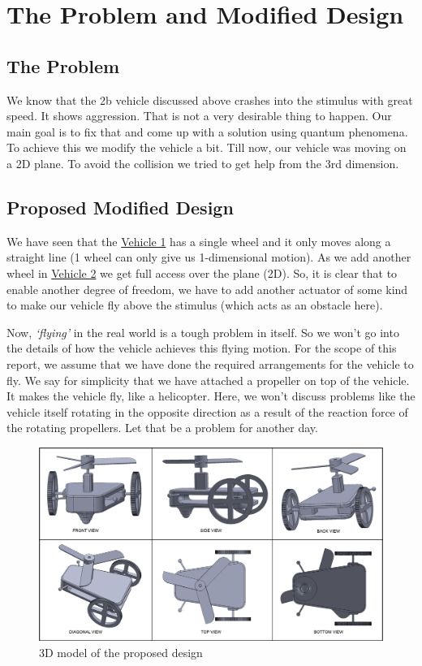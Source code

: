 \section{The Problem and Modified Design}
    
    \subsection{The Problem}
    We know that the 2b vehicle discussed above crashes into the stimulus with great speed. It shows aggression. That is not a very desirable thing to happen. Our main goal is to fix that and come up with a solution using quantum phenomena. To achieve this we modify the vehicle a bit. Till now, our vehicle was moving on a 2D plane. To avoid the collision we tried to get help from the 3rd dimension.
    
    \subsection{Proposed Modified Design}
    We have seen that the \hyperref[sec:Vehicle_1]{Vehicle 1} has a single wheel and it only moves along a straight line (1 wheel can only give us 1-dimensional motion). As we add another wheel in \hyperref[sec:Vehicle_2]{Vehicle 2} we get full access over the plane (2D). So, it is clear that to enable another degree of freedom, we have to add another actuator of some kind to make our vehicle fly above the stimulus (which acts as an obstacle here).

    Now, \textit{`flying'} in the real world is a tough problem in itself. So we won't go into the details of how the vehicle achieves this flying motion. For the scope of this report, we assume that we have done the required arrangements for the vehicle to fly. We say for simplicity that we have attached a propeller on top of the vehicle. It makes the vehicle fly, like a helicopter. Here, we won't discuss problems like the vehicle itself rotating in the opposite direction as a result of the reaction force of the rotating propellers. Let that be a problem for another day.
    
    \begin{figure}[t]%
        \centering
        \includegraphics[width=14cm]{./images/vehicle_3D_grouped.png} 
        \caption{3D model of the proposed design}%
        \label{fig:3D_design}%
    \end{figure}
    
